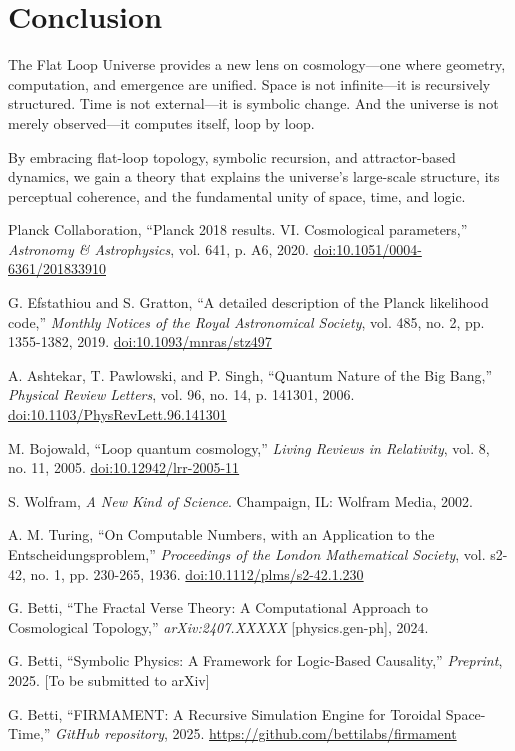 \documentclass[12pt]{article}
\begin{document}
\section{Conclusion}
The Flat Loop Universe provides a new lens on cosmology—one where geometry, computation, and emergence are unified. Space is not infinite—it is recursively structured. Time is not external—it is symbolic change. And the universe is not merely observed—it computes itself, loop by loop.

By embracing flat-loop topology, symbolic recursion, and attractor-based dynamics, we gain a theory that explains the universe’s large-scale structure, its perceptual coherence, and the fundamental unity of space, time, and logic.

\begin{thebibliography}{99}

Planck Collaboration, ``Planck 2018 results. VI. Cosmological parameters,''
\textit{Astronomy \& Astrophysics}, vol. 641, p. A6, 2020.
\href{https://doi.org/10.1051/0004-6361/201833910}{doi:10.1051/0004-6361/201833910}

G. Efstathiou and S. Gratton, ``A detailed description of the Planck likelihood code,''
\textit{Monthly Notices of the Royal Astronomical Society}, vol. 485, no. 2, pp. 1355-1382, 2019.
\href{https://doi.org/10.1093/mnras/stz497}{doi:10.1093/mnras/stz497}

A. Ashtekar, T. Pawlowski, and P. Singh, ``Quantum Nature of the Big Bang,''
\textit{Physical Review Letters}, vol. 96, no. 14, p. 141301, 2006.
\href{https://doi.org/10.1103/PhysRevLett.96.141301}{doi:10.1103/PhysRevLett.96.141301}

M. Bojowald, ``Loop quantum cosmology,''
\textit{Living Reviews in Relativity}, vol. 8, no. 11, 2005.
\href{https://doi.org/10.12942/lrr-2005-11}{doi:10.12942/lrr-2005-11}

S. Wolfram, \textit{A New Kind of Science}.
Champaign, IL: Wolfram Media, 2002.

A. M. Turing, ``On Computable Numbers, with an Application to the Entscheidungsproblem,''
\textit{Proceedings of the London Mathematical Society}, vol. s2-42, no. 1, pp. 230-265, 1936.
\href{https://doi.org/10.1112/plms/s2-42.1.230}{doi:10.1112/plms/s2-42.1.230}

G. Betti, ``The Fractal Verse Theory: A Computational Approach to Cosmological Topology,''
\textit{arXiv:2407.XXXXX} [physics.gen-ph], 2024.

G. Betti, ``Symbolic Physics: A Framework for Logic-Based Causality,''
\textit{Preprint}, 2025. [To be submitted to arXiv]

G. Betti, ``FIRMAMENT: A Recursive Simulation Engine for Toroidal Space-Time,''
\textit{GitHub repository}, 2025. \url{https://github.com/bettilabs/firmament}

\end{thebibliography}
\end{document}
